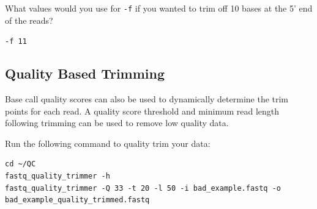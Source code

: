 \begin{questions}
What values would you use for \texttt{-f} if you wanted to trim off 10 bases at
the 5' end of the reads?
\begin{answer}
\texttt{-f 11}
\end{answer}
\end{questions}

\subsection{Quality Based Trimming}
Base call quality scores can also be used to dynamically determine the trim points for each read. A quality
score threshold and minimum read length following trimming can be used to remove low
quality data.

\begin{steps}
Run the following command to quality trim your data:
\begin{lstlisting}
cd ~/QC
fastq_quality_trimmer -h
fastq_quality_trimmer -Q 33 -t 20 -l 50 -i bad_example.fastq -o bad_example_quality_trimmed.fastq
\end{lstlisting}
\end{steps}

